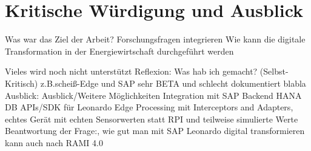 \section{Kritische Würdigung und Ausblick}

Was war das Ziel der Arbeit? Forschungsfragen integrieren
Wie kann die digitale Transformation in der Energiewirtschaft durchgeführt werden

Vieles wird noch nicht unterstützt
Reflexion:
Was hab ich gemacht? (Selbst-Kritisch) z.B.scheiß-Edge und SAP sehr BETA und schlecht dokumentiert blabla
\newline
Ausblick:
Ausblick/Weitere Möglichkeiten
Integration mit SAP Backend
HANA DB
APIs/SDK für Leonardo
Edge Processing mit Interceptors and Adapters, echtes Gerät mit echten Sensorwerten statt RPI und teilweise simulierte Werte
\newline
Beantwortung der Frage:, wie gut man mit SAP Leonardo digital transformieren kann auch nach RAMI 4.0

\newpage
